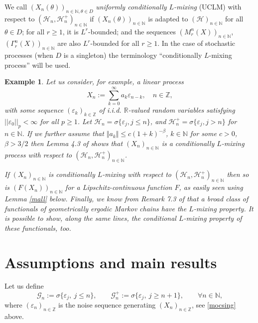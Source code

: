 \documentclass[a4paper]{article}
\newtheorem{example}[theorem]{Example}
\begin{document}
We call $(X_n(\theta))_{n\in\mathbb{N}, \theta\in D}$
\emph{uniformly {conditionally} $L$-mixing} (UCLM)
with respect to $(\mathcal{H}_n,\mathcal{H}_n^+)_{n\in \mathbb{N}}$ if
$(X_n(\theta))_{n\in\mathbb{N}}$ is adapted to
$(\mathcal{H})_{n\in\mathbb{N}}$
for all $\theta\in D$;
for all $r\geq 1$,
it is $L^r$-bounded;
and the sequences  $(M^n_r(X))_{n\in \mathbb{N}}$, $(\Gamma^n_r(X))_{n\in\mathbb{N}}$
are also $L^r$-bounded for all $r\geq 1$.
In the case of stochastic processes (when $D$ is a singleton)
the terminology ``conditionally $L$-mixing process'' will be used.

\begin{example}{\rm Let us consider, for example, a linear process
$$
X_n:=\sum_{k=0}^{\infty}a_k \varepsilon_{n-k},\quad n\in\mathbb{Z},
$$
with some sequence $(\varepsilon_k)_{k\in\mathbb{Z}}$ of i.i.d. $\mathbb{R}$-valued random variables satisfying $||\varepsilon_0||_p < \infty$ for all $p \ge 1$. Let $\mathcal{H}_n = \sigma\{ \varepsilon_j, j\le n\}$, and $\mathcal{H}^+_n = \sigma\{ \varepsilon_j, j > n\}$ for $n \in \mathbb{N}$.
If we further assume that $\Vert a_k\Vert\leq c (1+k)^{-\beta}$, $k\in\mathbb{N}$
for some $c>0$, $\beta>3/2$
then Lemma 4.3 of \cite{4} shows that $(X_n)_{n\in \mathbb{N}}$ is a conditionally $L$-mixing process with respect to $(\mathcal{H}_n,\mathcal{H}_n^+)_{n\in \mathbb{N}}$.

If $(X_n)_{n\in \mathbb{N}}$ is conditionally $L$-mixing with respect to $(\mathcal{H}_n,\mathcal{H}_n^+)_{n\in \mathbb{N}}$ then so is $(F(X_n))_{n \in \mathbb{N}}$ for a Lipschitz-continuous
function $F$, as easily seen using Lemma \ref{mall} below. Finally, we know
from Remark 7.3 of \cite{balazs} that a broad class of functionals of geometrically ergodic Markov chains have the $L$-mixing property. It is possible
to show, along the same lines, the conditional $L$-mixing property of
these functionals, too.}
\end{example}

\section{Assumptions and main results}\label{assump}

\color{red} Let us define  \color{black}
$$\mathcal{G}_n:=\sigma\{\varepsilon_j,\ j\leq n\}, \qquad \mathcal{G}^+_n:=\sigma\{\varepsilon_j,\ j\geq n+1\}, \qquad \forall n\in\mathbb{N},$$
where $(\varepsilon_n)_{n\in\mathbb{Z}}$ is the noise sequence generating
$(X_n)_{n\in\mathbb{Z}}$, see \eqref{mocsing} above.
\end{document}
